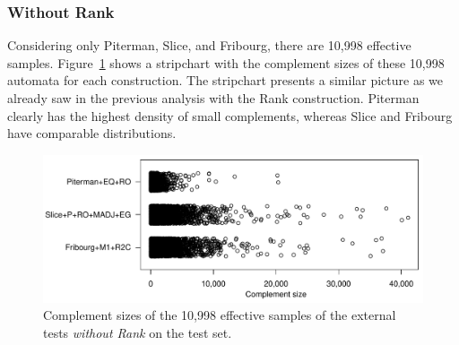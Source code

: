 
\subsubsection{Without Rank}
Considering only Piterman, Slice, and Fribourg, there are 10,998 effective samples. Figure~\ref{e.g.stripchart} shows a stripchart with the complement sizes of these 10,998 automata for each construction. The stripchart presents a similar picture as we already saw in the previous analysis with the Rank construction. Piterman clearly has the highest density of small complements, whereas Slice and Fribourg have comparable distributions.



\begin{figure}[ht]
\centering
\includegraphics[scale=0.575]{../results/figures/external/goal/s.stripchart.pdf}
\caption{Complement sizes of the 10,998 effective samples of the external tests \textit{without Rank} on the \goal{} test set.}
\label{e.g.stripchart}
\end{figure}

